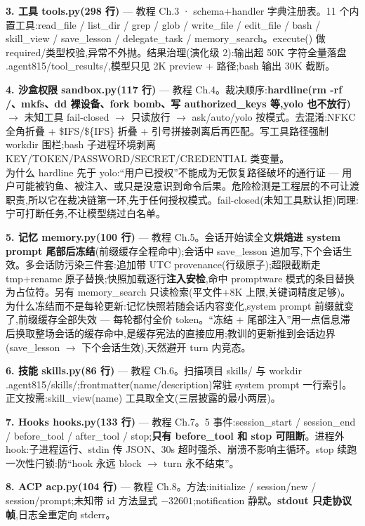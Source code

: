 \documentclass[10pt,a4paper]{article}
\renewcommand{\footnotesize}{\fontsize{7.5}{10.5}\selectfont}
\newcommand{\lv}[2]{\textcolor{#1}{\textbf{\footnotesize[#2]}}}
\begin{document}
\textbf{3. 工具 tools.py(298 行)\lv{okc}{L2}} --- 教程 Ch.3 · schema+handler 字典注册表。11 个内置工具:read\_file / list\_dir / grep / glob / write\_file / edit\_file / bash / skill\_view / save\_lesson / delegate\_task / memory\_search。execute() 做 required/类型校验,异常不外抛。结果治理(演化级 2):输出超 50K 字符全量落盘 .agent815/tool\_results/,模型只见 2K preview + 路径;bash 输出 30K 截断。

\textbf{4. 沙盒权限 sandbox.py(117 行)\lv{warnc}{L3 最小版}} --- 教程 Ch.4。裁决顺序:\textbf{hardline(rm -rf /、mkfs、dd 裸设备、fork bomb、写 authorized\_keys 等,yolo 也不放行)} $\to$ 未知工具 fail-closed $\to$ 只读放行 $\to$ ask/auto/yolo 按模式。去混淆:NFKC 全角折叠 + \$IFS/\$\{IFS\} 折叠 + 引号拼接剥离后再匹配。写工具路径强制 workdir 围栏;bash 子进程环境剥离 KEY/TOKEN/PASSWORD/SECRET/CREDENTIAL 类变量。\\
{\color{dimc}为什么 hardline 先于 yolo:}``用户已授权''不能成为无恢复路径破坏的通行证 --- 用户可能被钓鱼、被注入、或只是没意识到命令后果。危险检测是工程层的不可让渡职责,所以它在裁决链第一环,先于任何授权模式。fail-closed(未知工具默认拒)同理:宁可打断任务,不让模型绕过白名单。

\textbf{5. 记忆 memory.py(100 行)\lv{okc}{L2}} --- 教程 Ch.5。会话开始读全文\textbf{烘焙进 system prompt 尾部后冻结}(前缀缓存全程命中);会话中 save\_lesson 追加写,下个会话生效。多会话防污染三件套:追加带 UTC provenance(行级原子);超限截断走 tmp+rename 原子替换;快照加载逐行\textbf{注入安检},命中 promptware 模式的条目替换为占位符。另有 memory\_search 只读检索(平文件+8K 上限,关键词精度足够)。\\
{\color{dimc}为什么冻结而不是每轮更新:}记忆快照若随会话内容变化,system prompt 前缀就变了,前缀缓存全部失效 --- 每轮都付全价 token。``冻结 + 尾部注入''用一点信息滞后换取整场会话的缓存命中,是缓存宪法的直接应用;教训的更新推到会话边界(save\_lesson $\to$ 下个会话生效),天然避开 turn 内竞态。

\textbf{6. 技能 skills.py(86 行)\lv{acc}{L1}} --- 教程 Ch.6。扫描项目 skills/ 与 workdir .agent815/skills/;frontmatter(name/description)常驻 system prompt 一行索引。正文按需:skill\_view(name) 工具取全文(三层披露的最小两层)。

\textbf{7. Hooks hooks.py(133 行)\lv{okc}{L2}} --- 教程 Ch.7。5 事件:session\_start / session\_end / before\_tool / after\_tool / stop;\textbf{只有 before\_tool 和 stop 可阻断}。进程外 hook:子进程运行、stdin 传 JSON、30s 超时强杀、崩溃不影响主循环。stop 续跑一次性闩锁:防``hook 永远 block $\to$ turn 永不结束''。

\textbf{8. ACP acp.py(104 行)\lv{acc}{L1}} --- 教程 Ch.8。方法:initialize / session/new / session/prompt;未知带 id 方法显式 $-32601$;notification 静默。\textbf{stdout 只走协议帧},日志全重定向 stderr。
\end{document}
